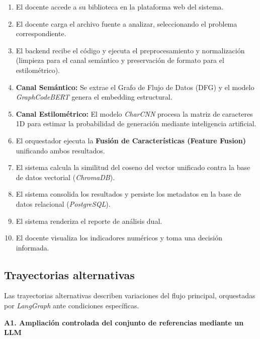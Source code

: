 \begin{enumerate}
	\item El docente accede a su biblioteca en la plataforma web del sistema.
	\item El docente carga el archivo fuente a analizar, seleccionando el problema correspondiente.
	\item El backend recibe el código y ejecuta el preprocesamiento y normalización (limpieza para el canal semántico y preservación de formato para el estilométrico).
	\item \textbf{Canal Semántico:} Se extrae el Grafo de Flujo de Datos (DFG) y el modelo \textit{GraphCodeBERT} genera el embedding estructural.
	\item \textbf{Canal Estilométrico:} El modelo \textit{CharCNN} procesa la matriz de caracteres 1D para estimar la probabilidad de generación mediante inteligencia artificial.
	\item El orquestador ejecuta la \textbf{Fusión de Características (Feature Fusion)} unificando ambos resultados.
	\item El sistema calcula la similitud del coseno del vector unificado contra la base de datos vectorial (\textit{ChromaDB}).
	\item El sistema consolida los resultados y persiste los metadatos en la base de datos relacional (\textit{PostgreSQL}).
	\item El sistema renderiza el reporte de análisis dual.
	\item El docente visualiza los indicadores numéricos y toma una decisión informada.
\end{enumerate}

\subsection{Trayectorias alternativas}

Las trayectorias alternativas describen variaciones del flujo principal, orquestadas por \textit{LangGraph} ante condiciones específicas.

\textbf{A1. Ampliación controlada del conjunto de referencias mediante un LLM}

